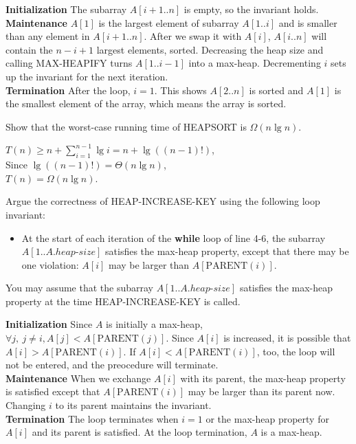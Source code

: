 \documentclass[12pt, a4paper, UTF8]{ctexart}
\begin{document}
\begin{solution}
  \textbf{Initialization} The subarray $A[i+1..n]$ is empty, so the 
  invariant holds.\\
  \textbf{Maintenance} $A[1]$ is the largest element of subarray $A[1..i]$ 
  and is smaller than any element in $A[i+1..n]$. After we swap it 
  with $A[i]$, $A[i..n]$ will contain the $n-i+1$ largest elements, 
  sorted. Decreasing the heap size and calling MAX-HEAPIFY turns 
  $A[1..i-1]$ into a max-heap. Decrementing $i$ sets up the invariant 
  for the next iteration.\\
  \textbf{Termination} After the loop, $i = 1$. This shows $A[2..n]$ 
  is sorted and $A[1]$ is the smallest element of the array, which 
  means the array is sorted.\\
\end{solution}

\begin{problem}[TC: 6.4-4]
  Show that the worst-case running time of HEAPSORT is $\Omega(n\lg n)$.
\end{problem}

\begin{solution}
  $T(n) \geq n + \sum\limits_{i = 1}^{n - 1}\lg i = n + \lg((n-1)!)$,\\
  Since $\lg((n-1)!) = \Theta(n\lg n)$,\\
  $T(n) = \Omega(n\lg n)$.
\end{solution}

\begin{problem}[TC: 6.5-5]
  Argue the correctness of HEAP-INCREASE-KEY using the following loop 
  invariant:
  \begin{itemize}
    \item [] At the start of each iteration of the \textbf{while} loop 
    of line 4-6, the subarray $A[1..A.heap\text{-}size]$ satisfies the 
    max-heap property, except that there may be one violation: $A[i]$ 
    may be larger than $A[\text{PARENT}(i)]$.
  \end{itemize}
  You may assume that the subarray $A[1..A.heap\text{-}size]$ satisfies 
  the max-heap property at the time HEAP-INCREASE-KEY is called.
\end{problem}

\begin{solution}
  \textbf{Initialization} Since $A$ is initially a max-heap, $\forall 
  j,~j\neq i, A[j] < A[\text{PARENT}(j)]$. Since $A[i]$ is increased, 
  it is possible that $A[i] > A[\text{PARENT}(i)]$. If $A[i] < A[\text{PARENT}(i)]$, 
  too, the loop will not be entered, and the preocedure will terminate.\\
  \textbf{Maintenance} When we exchange $A[i]$ with its parent, the 
  max-heap property is satisfied except that $A[\text{PARENT}(i)]$ may 
  be larger than its parent now. Changing $i$ to its parent maintains 
  the invariant.\\
  \textbf{Termination} The loop terminates when $i = 1$ or the max-heap 
  property for $A[i]$ and its parent is satisfied. At the loop termination, 
  $A$ is a max-heap.
\end{solution}
\end{document}

